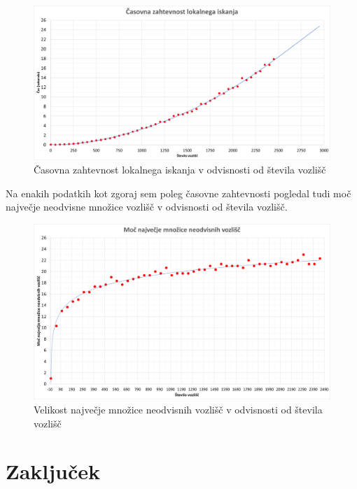 \documentclass[a4paper, 12 pt]{article}
\theoremstyle{definition}
\theoremstyle{plain}
\theoremstyle{remark}
\begin{document}
\begin{figure}[H]
\centering
  \includegraphics[scale=0.29]{casovna_ zahtevnost_LOKISK.png}
  \caption{Časovna zahtevnost lokalnega iskanja v odvisnosti od števila vozlišč}
  \label{fig:casovna zahtevnost} 
\end{figure}

Na enakih podatkih kot zgoraj sem poleg časovne zahtevnosti pogledal tudi moč največje neodvisne množice vozlišč v odvisnosti od števila vozlišč. 

\begin{figure}[H]
\centering
  \includegraphics[scale=0.29]{moc_odv_od_stvozlisc.png}
  \caption{Velikost največje množice neodvisnih vozlišč v odvisnosti od števila vozlišč}
  \label{fig:moc od vozlisc} 
\end{figure}

\section{Zaključek} %



\end{document}

